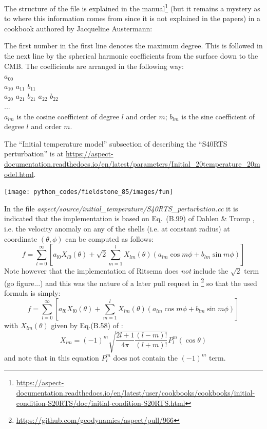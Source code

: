 The structure of the file is explained in the \aspect manual\footnote{
\url{https://aspect-documentation.readthedocs.io/en/latest/user/cookbooks/cookbooks/initial-condition-S20RTS/doc/initial-condition-S20RTS.html}} (but it remains a mystery 
as to where this information comes from since it is not explained in the papers) 
in a cookbook authored by Jacqueline Austermann:  
\begin{displayquote}
{\color{darkgray}
The first number in the first line denotes the maximum degree. This is followed in
the next line by the spherical harmonic coefficients from the surface down to the
CMB. The coefficients are arranged in the following way:\\
$a_{00}$ \\
$a_{10}$ $a_{11}$ $b_{11}$ \\
$a_{20}$ $a_{21}$ $b_{21}$ $a_{22}$ $b_{22}$ \\
... \\
$a_{lm}$ is the cosine coefficient of degree $l$ and order $m$; $b_{lm}$ is
the sine coefficient of degree $l$ and order $m$.}
\end{displayquote}

The ``Initial temperature model'' subsection of \aspect describing the ``S40RTS perturbation''
is at \url{https://aspect-documentation.readthedocs.io/en/latest/parameters/Initial_20temperature_20model.html}.

\begin{center}
\texttt{[image: python\_codes/fieldstone\_85/images/fun]}
\end{center}


In the file {\sl aspect/source/initial\_temperature/S40RTS\_perturbation.cc} it is 
indicated that the implementation is based on Eq.~(B.99) of Dahlen \& Tromp \cite{datr98}, 
i.e. the velocity anomaly on any of the shells 
(i.e. at constant radius) at coordinate $(\theta,\phi)$ can be computed as follows:
\[
f = \sum_{l=0}^\infty \left[a_{l0} X_{l0}(\theta) + \sqrt{2} \sum_{m=1}^l X_{lm}(\theta) 
\left(a_{lm} \cos m\phi + b_{lm} \sin m\phi \right) \right]
\]
Note however that the implementation of Ritsema does {\it not} include 
the $\sqrt{2}$ term (go figure...) and this 
was the nature of a later pull request in \aspect \footnote{\url{https://github.com/geodynamics/aspect/pull/966}} 
so that the used formula is simply:
\[
\boxed{
f = \sum_{l=0}^\infty \left[a_{l0} X_{l0}(\theta) + \sum_{m=1}^l X_{lm}(\theta) 
(a_{lm} \cos m\phi + b_{lm} \sin m\phi) \right]
}
\]
with $X_{lm}(\theta)$ given by Eq.(B.58) of  \cite{datr98}:
\[
\boxed{
X_{lm} = (-1)^m \sqrt{ \frac{2l+1}{4\pi} \frac{(l-m)!}{(l+m)!} } P_l^m(\cos\theta)
}
\]
and note that in this equation $P_l^m$ does not contain the $(-1)^m$ term.

